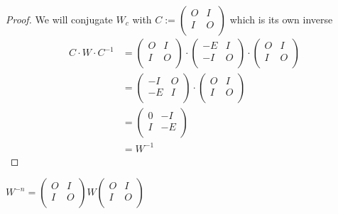 \begin{proof}
  We will conjugate $W_{c}$ with 
  $C := \left(\begin{smallmatrix} O & I \\ I & O \\\end{smallmatrix}\right)$
  which is its own inverse
  \[
  \begin{aligned}
  C \cdot W \cdot C^{-1}
  & =
  \left(
  \begin{array}{cc}
    O & I \\
    I & O \\
  \end{array}
  \right)
  \cdot
  \left(
  \begin{array}{cc}
    -E & I \\
    -I & O \\
  \end{array}
  \right)
  \cdot
  \left(
  \begin{array}{cc}
    O & I \\
    I & O \\
  \end{array}
  \right) \\
  & =
  \left(
  \begin{array}{cc}
    -I & O \\
    -E & I \\
  \end{array}
  \right)
  \cdot
  \left(
  \begin{array}{cc}
    O & I \\
    I & O \\
  \end{array}
  \right) \\
  & =
  \left(
  \begin{array}{cc}
    0 & -I \\
    I & -E \\
  \end{array}
  \right) \\
  & =
  W^{-1}
  \end{aligned}
  \]
\end{proof}

\begin{corollary}
  $W^{-n} = 
  \left(\begin{smallmatrix} O & I \\ I & O \\\end{smallmatrix}\right) 
  W 
  \left(\begin{smallmatrix} O & I \\ I & O \\\end{smallmatrix}\right)$
\end{corollary}

